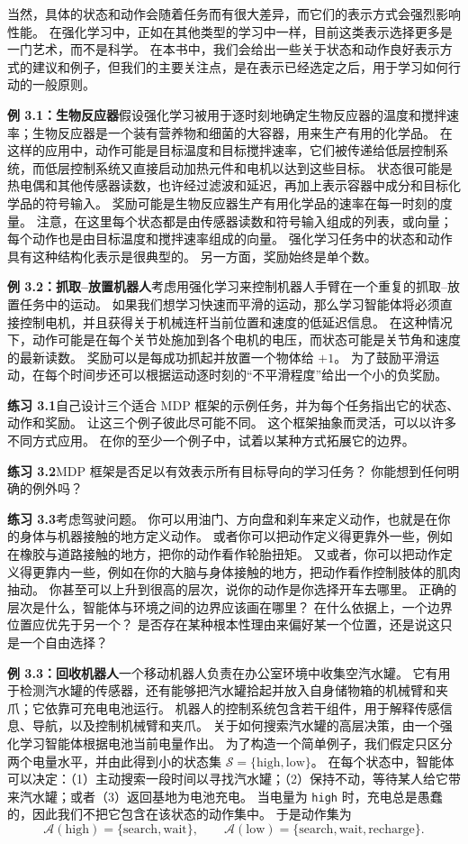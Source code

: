 \documentclass[UTF8,12pt,a4paper,fontset=fandol]{ctexart}
\begin{document}
当然，具体的状态和动作会随着任务而有很大差异，而它们的表示方式会强烈影响性能。
在强化学习中，正如在其他类型的学习中一样，目前这类表示选择更多是一门艺术，而不是科学。
在本书中，我们会给出一些关于状态和动作良好表示方式的建议和例子，但我们的主要关注点，是在表示已经选定之后，用于学习如何行动的一般原则。

\noindent\textbf{例 3.1：生物反应器}\quad 假设强化学习被用于逐时刻地确定生物反应器的温度和搅拌速率；生物反应器是一个装有营养物和细菌的大容器，用来生产有用的化学品。
在这样的应用中，动作可能是目标温度和目标搅拌速率，它们被传递给低层控制系统，而低层控制系统又直接启动加热元件和电机以达到这些目标。
状态很可能是热电偶和其他传感器读数，也许经过滤波和延迟，再加上表示容器中成分和目标化学品的符号输入。
奖励可能是生物反应器生产有用化学品的速率在每一时刻的度量。
注意，在这里每个状态都是由传感器读数和符号输入组成的列表，或向量；每个动作也是由目标温度和搅拌速率组成的向量。
强化学习任务中的状态和动作具有这种结构化表示是很典型的。
另一方面，奖励始终是单个数。

\noindent\textbf{例 3.2：抓取--放置机器人}\quad 考虑用强化学习来控制机器人手臂在一个重复的抓取--放置任务中的运动。
如果我们想学习快速而平滑的运动，那么学习智能体将必须直接控制电机，并且获得关于机械连杆当前位置和速度的低延迟信息。
在这种情况下，动作可能是在每个关节处施加到各个电机的电压，而状态可能是关节角和速度的最新读数。
奖励可以是每成功抓起并放置一个物体给 $+1$。
为了鼓励平滑运动，在每个时间步还可以根据运动逐时刻的“不平滑程度”给出一个小的负奖励。

\noindent\textbf{练习 3.1}\quad 自己设计三个适合 MDP 框架的示例任务，并为每个任务指出它的状态、动作和奖励。
让这三个例子彼此尽可能不同。
这个框架抽象而灵活，可以以许多不同方式应用。
在你的至少一个例子中，试着以某种方式拓展它的边界。

\noindent\textbf{练习 3.2}\quad MDP 框架是否足以有效表示所有目标导向的学习任务？
你能想到任何明确的例外吗？

\noindent\textbf{练习 3.3}\quad 考虑驾驶问题。
你可以用油门、方向盘和刹车来定义动作，也就是在你的身体与机器接触的地方定义动作。
或者你可以把动作定义得更靠外一些，例如在橡胶与道路接触的地方，把你的动作看作轮胎扭矩。
又或者，你可以把动作定义得更靠内一些，例如在你的大脑与身体接触的地方，把动作看作控制肢体的肌肉抽动。
你甚至可以上升到很高的层次，说你的动作是你选择开车去哪里。
正确的层次是什么，智能体与环境之间的边界应该画在哪里？
在什么依据上，一个边界位置应优先于另一个？
是否存在某种根本性理由来偏好某一个位置，还是说这只是一个自由选择？

\noindent\textbf{例 3.3：回收机器人}\quad 一个移动机器人负责在办公室环境中收集空汽水罐。
它有用于检测汽水罐的传感器，还有能够把汽水罐拾起并放入自身储物箱的机械臂和夹爪；它依靠可充电电池运行。
机器人的控制系统包含若干组件，用于解释传感信息、导航，以及控制机械臂和夹爪。
关于如何搜索汽水罐的高层决策，由一个强化学习智能体根据电池当前电量作出。
为了构造一个简单例子，我们假定只区分两个电量水平，并由此得到小的状态集 $\mathcal{S}=\{\text{high},\text{low}\}$。
在每个状态中，智能体可以决定：（1）主动搜索一段时间以寻找汽水罐；（2）保持不动，等待某人给它带来汽水罐；或者（3）返回基地为电池充电。
当电量为 \texttt{high} 时，充电总是愚蠢的，因此我们不把它包含在该状态的动作集中。
于是动作集为
\[
\mathcal{A}(\text{high})=\{\text{search},\text{wait}\},\qquad
\mathcal{A}(\text{low})=\{\text{search},\text{wait},\text{recharge}\}.
\]
\end{document}
